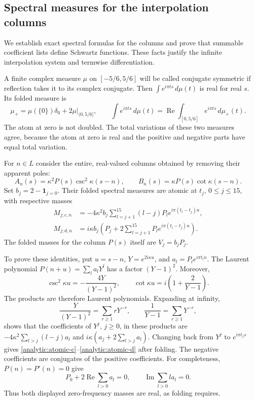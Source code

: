 \documentclass[11pt]{article}
\theoremstyle{remark}\newtheorem{remark}[theorem]{Remark}
\begin{document}
\subsection{Spectral measures for the interpolation columns}

We establish exact spectral formulas for the columns and prove that
summable coefficient lists define Schwartz functions. These facts justify
the infinite interpolation system and termwise differentiation.

A finite complex measure $\mu$ on $[-5/6,5/6]$ will be called
conjugate symmetric if reflection takes it to its complex conjugate.
Then $\int e^{i\pi ts}\,d\mu(t)$ is real for real $s$.
Its folded measure is
\[
 \mu_+=\mu(\{0\})\delta_0+2\mu|_{(0,5/6]},
 \qquad
 \int e^{i\pi ts}\,d\mu(t)
 =\operatorname{Re}\int_{[0,5/6]}e^{i\pi ts}\,d\mu_+(t).
\]
The atom at zero is not doubled.  The total variations of these two
measures agree, because the atom at zero is real and the positive and
negative parts have equal total variation.

For $n\in L$ consider the entire, real-valued columns obtained by
removing their apparent poles:
\[
 A_n(s)=\kappa^2 P(s)\csc^2\kappa(s-n),\qquad
 B_n(s)=\kappa P(s)\cot\kappa(s-n).
\]
Set $b_j=2-\mathbf1_{j=0}$.  Their folded spectral measures are atomic
at $t_j$, $0\le j\le15$, with respective masses
\begin{align}
 M_{j;c,n}
 &=-4\kappa^2b_j
     \sum_{l=j+1}^{15}(l-j)P_l e^{i\pi(t_l-t_j)n},
 \label{analytic:atomic-c}\\
 M_{j;d,n}
 &=i\kappa b_j\left(P_j+
     2\sum_{l=j+1}^{15}P_l e^{i\pi(t_l-t_j)n}\right).
 \label{analytic:atomic-d}
\end{align}
The folded masses for the column $P(s)$ itself are $V_j=b_jP_j$.

To prove these identities, put $u=s-n$, $Y=e^{2i\kappa u}$, and
$a_l=P_l e^{i\pi t_ln}$.  The Laurent polynomial
$P(n+u)=\sum_l a_lY^l$ has a factor $(Y-1)^2$.  Moreover,
\[
 \csc^2\kappa u=-\frac{4Y}{(Y-1)^2},\qquad
 \cot\kappa u=i\left(1+\frac2{Y-1}\right).
\]
The products are therefore Laurent polynomials.  Expanding at infinity,
\[
 \frac{Y}{(Y-1)^2}=\sum_{r\ge1}rY^{-r},\qquad
 \frac1{Y-1}=\sum_{r\ge1}Y^{-r},
\]
shows that the coefficients of $Y^j$, $j\ge0$, in these products are
$-4\kappa^2\sum_{l>j}(l-j)a_l$ and
$i\kappa(a_j+2\sum_{l>j}a_l)$.
Changing back from $Y^j$ to $e^{i\pi t_js}$ gives
\eqref{analytic:atomic-c}--\eqref{analytic:atomic-d} after folding.
The negative coefficients are conjugates of the positive coefficients.
For completeness, $P(n)=P'(n)=0$ give
\[
 P_0+2\operatorname{Re}\sum_{l>0}a_l=0,
 \qquad \operatorname{Im}\sum_{l>0}l a_l=0.
\]
Thus both displayed zero-frequency masses are real, as folding requires.
\end{document}

